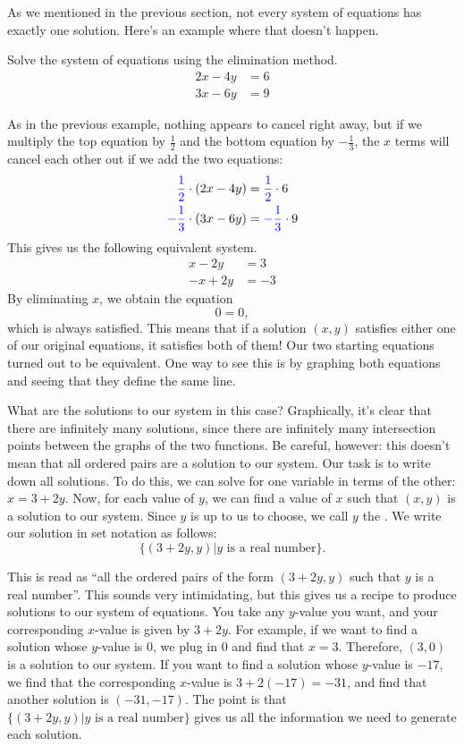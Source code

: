 \documentclass[nooutcomes]{ximera}
\begin{document}
As we mentioned in the previous section, not every system of equations has exactly one solution. Here's an example where that doesn't happen. 

\begin{example}
Solve the system of equations using the elimination method.
\begin{align*}
2x - 4y & = 6 \\
3x - 6y & = 9
\end{align*}
\begin{explanation}
As in the previous example, nothing appears to cancel right away, but if we multiply the top equation by $\frac{1}{2}$ and the bottom equation by $-\frac{1}{3}$, the $x$ terms will cancel each other out if we add the two equations:
\begin{align*}
{\color{blue}{{\frac{1}{2}}}}\cdot (2x - 4y) & = {\color{blue}{{\frac{1}{2}}}}\cdot 6 \\
{\color{blue}{{-\frac{1}{3}}}}\cdot (3x - 6y) & = {\color{blue}{{-\frac{1}{3}}}}\cdot 9
\end{align*}
This gives us the following equivalent system.
\begin{align*}
x - 2y & = 3 \\
-x + 2y & = -3
\end{align*}
By eliminating $x$, we obtain the equation 
$$
0 = 0,
$$
which is always satisfied. This means that if a solution $(x, y)$ satisfies either one of our original equations, it satisfies both of them! Our two starting equations turned out to be equivalent. One way to see this is by graphing both equations and seeing that they define the same line. 

What are the solutions to our system in this case? Graphically, it's clear that there are infinitely many solutions, since there are infinitely many intersection points between the graphs of the two functions. Be careful, however: this doesn't mean that all ordered pairs are a solution to our system. Our task is to write down all solutions. To do this, we can solve for one variable in terms of the other: $x = 3 + 2y$. Now, for each value of $y$, we can find a value of $x$ such that $(x, y)$ is a solution to our system. Since $y$ is up to us to choose, we call $y$ the . We write our solution in set notation as follows: 
$$
\{(3 + 2y, y) | y \text{ is a real number}\}.
$$ 

This is read as ``all the ordered pairs of the form $(3 + 2y, y)$ such that $y$ is a real number''. This sounds very intimidating, but this gives us a recipe to produce solutions to our system of equations. You take any $y$-value you want, and your corresponding $x$-value is given by $3 + 2y$. For example, if we want to find a solution whose $y$-value is 0, we plug in 0 and find that $x = 3$. Therefore, $(3, 0)$ is a solution to our system. If you want to find a solution whose $y$-value is $-17$, we find that the corresponding $x$-value is $3 + 2(-17) = -31$, and find that another solution is $(-31, -17)$. The point is that $\{(3 + 2y, y) | y \text{ is a real number}\}$ gives us all the information we need to generate each solution.  
\end{explanation}
\end{example}
\end{document}
